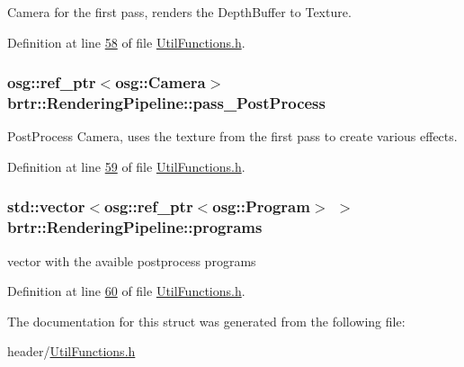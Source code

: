 Camera for the first pass, renders the Depth\+Buffer to Texture. 



Definition at line \hyperlink{_util_functions_8h_source_l00058}{58} of file \hyperlink{_util_functions_8h_source}{Util\+Functions.\+h}.

\hypertarget{structbrtr_1_1_rendering_pipeline_aea2228e41f1e5c6db5d616c05ecc27fd}{
\subsubsection[{pass\+\_\+\+Post\+Process}]{\setlength{\rightskip}{0pt plus 5cm}osg\+::ref\+\_\+ptr$<$osg\+::\+Camera$>$ brtr\+::\+Rendering\+Pipeline\+::pass\+\_\+\+Post\+Process}}\label{structbrtr_1_1_rendering_pipeline_aea2228e41f1e5c6db5d616c05ecc27fd}


Post\+Process Camera, uses the texture from the first pass to create various effects. 



Definition at line \hyperlink{_util_functions_8h_source_l00059}{59} of file \hyperlink{_util_functions_8h_source}{Util\+Functions.\+h}.

\hypertarget{structbrtr_1_1_rendering_pipeline_afe773fb98986d39ef23a4edf3634af10}{
\subsubsection[{programs}]{\setlength{\rightskip}{0pt plus 5cm}std\+::vector$<$osg\+::ref\+\_\+ptr$<$osg\+::\+Program$>$ $>$ brtr\+::\+Rendering\+Pipeline\+::programs}}\label{structbrtr_1_1_rendering_pipeline_afe773fb98986d39ef23a4edf3634af10}


vector with the avaible postprocess programs 



Definition at line \hyperlink{_util_functions_8h_source_l00060}{60} of file \hyperlink{_util_functions_8h_source}{Util\+Functions.\+h}.



The documentation for this struct was generated from the following file\+:\begin{DoxyCompactItemize}
\item 
header/\hyperlink{_util_functions_8h}{Util\+Functions.\+h}\end{DoxyCompactItemize}
